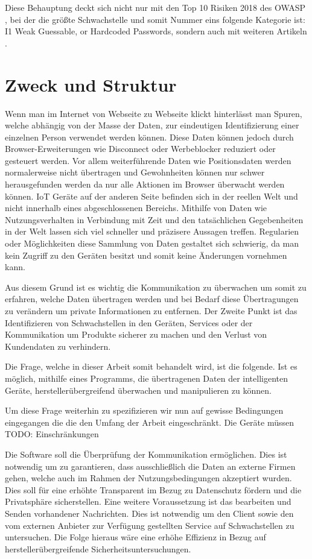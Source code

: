 Diese Behauptung deckt sich nicht nur mit den Top 10 Risiken 2018 des \ac{OWASP} \cite{guzman_2019}, bei der die größte Schwachstelle und somit Nummer eins folgende Kategorie ist: \glqq I1 Weak Guessable, or Hardcoded Passwords\grqq{}, sondern auch mit weiteren Artikeln \cite{eckstein_2018}.

\section{Zweck und Struktur}
    Wenn man im Internet von Webseite zu Webseite klickt hinterlässt man Spuren, welche abhängig von der Masse der Daten, zur eindeutigen Identifizierung einer einzelnen Person verwendet werden können. %
    Diese Daten können jedoch durch Browser-Erweiterungen wie Disconnect oder Werbeblocker reduziert oder gesteuert werden. Vor allem weiterführende Daten wie Positionsdaten werden normalerweise nicht übertragen und Gewohnheiten können nur schwer herausgefunden werden da nur alle Aktionen im Browser überwacht werden können.
    \ac{IoT} Geräte auf der anderen Seite befinden sich in der reellen Welt und nicht innerhalb eines abgeschlossenen Bereichs. Mithilfe von Daten wie Nutzungsverhalten in Verbindung mit Zeit und den tatsächlichen Gegebenheiten in der Welt lassen sich viel schneller und präzisere Aussagen treffen. Regularien oder Möglichkeiten diese Sammlung von Daten gestaltet sich schwierig, da man kein Zugriff zu den Geräten besitzt und somit keine Änderungen vornehmen kann.
    
    Aus diesem Grund ist es wichtig die Kommunikation zu überwachen um somit zu erfahren, welche Daten übertragen werden und bei Bedarf diese Übertragungen zu verändern um private Informationen zu entfernen.
    Der Zweite Punkt ist das Identifizieren von Schwachstellen in den Geräten, Services oder der Kommunikation um Produkte sicherer zu machen und den Verlust von Kundendaten zu verhindern.
    
    Die Frage, welche in dieser Arbeit somit behandelt wird, ist die folgende.
    Ist es möglich, mithilfe eines Programms, die übertragenen Daten der intelligenten Geräte, herstellerübergreifend überwachen und manipulieren zu können.
    
    Um diese Frage weiterhin zu spezifizieren wir nun auf gewisse Bedingungen eingegangen die die den Umfang der Arbeit eingeschränkt.
    Die Geräte müssen 
    TODO: Einschränkungen
    
    Die Software soll die Überprüfung der Kommunikation ermöglichen. Dies ist notwendig um zu garantieren, dass ausschließlich die Daten an externe Firmen gehen, welche auch im Rahmen der Nutzungsbedingungen akzeptiert wurden. Dies soll für eine erhöhte Transparent im Bezug zu Datenschutz fördern und die Privatsphäre sicherstellen.
    Eine weitere Voraussetzung ist das bearbeiten und Senden vorhandener Nachrichten. Dies ist notwendig um den Client sowie den vom externen Anbieter zur Verfügung gestellten Service auf Schwachstellen zu untersuchen. Die Folge hieraus wäre eine erhöhe Effizienz in Bezug auf herstellerübergreifende Sicherheitsuntersuchungen.


